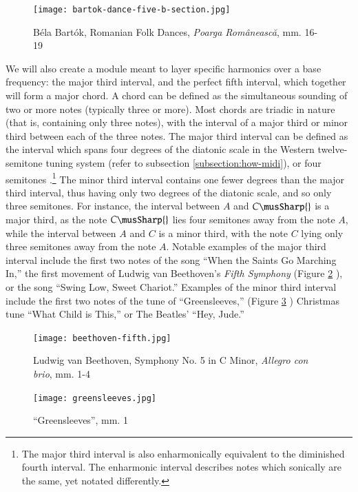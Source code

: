 \begin{figure}[h]
  \centering
  \texttt{[image: bartok-dance-five-b-section.jpg]}
  \caption{Béla Bartók, Romanian Folk Dances, \textit{Poarga Românească}, mm. 16-19}
  \label{fig:bartok-dance-five-b-section}
\end{figure}

We will also create a module meant to layer specific harmonics over a base frequency: the major third interval, and the perfect fifth interval, which together will form a major chord. A chord can be defined as the simultaneous sounding of two or more notes (typically three or more). Most chords are triadic in nature (that is, containing only three notes), with the interval of a major third or minor third between each of the three notes. The major third interval can be defined as the interval which spans four degrees of the diatonic scale in the Western twelve-semitone tuning system (refer to subsection \ref{subsection:how-midi}), or four semitones \cite{Nave_2017}.\footnote{The major third interval is also enharmonically equivalent to the diminished fourth interval. The enharmonic interval describes notes which sonically are the same, yet notated differently.} The minor third interval contains one fewer degrees than the major third interval, thus having only two degrees of the diatonic scale, and so only three semitones. For instance, the interval between $A$ and $C\musSharp{}$ is a major third, as the note $C\musSharp{}$ lies four semitones away from the note $A$, while the interval between $A$ and $C$ is a minor third, with the note $C$ lying only three semitones away from the note $A$. Notable examples of the major third interval include the first two notes of the song ``When the Saints Go Marching In,'' the first movement of Ludwig van Beethoven's \textit{Fifth Symphony} (Figure \ref{fig:beethoven-fifth} \cite{Beethoven_1862}), or the song ``Swing Low, Sweet Chariot.'' Examples of the minor third interval include the first two notes of the tune of ``Greensleeves,'' (Figure \ref{fig:greensleeves} \cite{Kurtz_2010}) Christmas tune ``What Child is This,'' or The Beatles' ``Hey, Jude.''

\begin{figure}[ht]
  \centering
  \texttt{[image: beethoven-fifth.jpg]}
  \caption{Ludwig van Beethoven, Symphony No. 5 in C Minor, \textit{Allegro con brio}, mm. 1-4}
  \label{fig:beethoven-fifth}
\end{figure}

\begin{figure}[ht]
  \centering
  \texttt{[image: greensleeves.jpg]}
  \caption{``Greensleeves'', mm. 1}
  \label{fig:greensleeves}
\end{figure}

